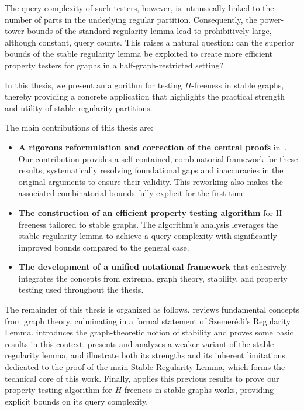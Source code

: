 The query complexity of such testers, however, is intrinsically linked to the number of parts in the underlying regular
partition.
Consequently, the power-tower bounds of the standard regularity lemma lead to prohibitively large, although constant,
query counts.
This raises a natural question: can the superior bounds of the stable regularity lemma be exploited to create more
efficient property testers for graphs in a half-graph-restricted setting?

In this thesis, we present an algorithm for testing $H$-freeness in stable graphs, thereby providing
a concrete application that highlights the practical strength and utility of stable regularity partitions.

The main contributions of this thesis are:
\begin{itemize}
    \item \textbf{A rigorous reformulation and correction of the central proofs}
        in~\cite{regularity_lemmas_for_stable_graphs}.
        Our contribution provides a self-contained, combinatorial framework for these results, systematically
        resolving foundational gaps and inaccuracies in the original arguments to ensure their validity.
        This reworking also makes the associated combinatorial bounds fully explicit for the first time.
    \item \textbf{The construction of an efficient property testing algorithm} for H-freeness tailored to stable graphs.
        The algorithm's analysis leverages the stable regularity lemma to achieve a query complexity with significantly
        improved bounds compared to the general case.
    \item \textbf{The development of a unified notational framework} that cohesively integrates the concepts from
        extremal graph theory, stability, and property testing used throughout the thesis.
\end{itemize}

The remainder of this thesis is organized as follows.
 reviews fundamental concepts from graph theory, culminating in a formal statement of Szemerédi's
Regularity Lemma.
 introduces the graph-theoretic notion of stability and proves some basic results in this context.
 presents and analyzes a weaker variant of the stable regularity lemma, and illustrate both its
strengths and its inherent limitations.
 dedicated to the proof of the main Stable Regularity Lemma, which forms the technical core of this
work.
Finally,  applies this previous results to prove our property testing algorithm for
$H$-freeness in stable graphs works, providing explicit bounds on its query complexity.
